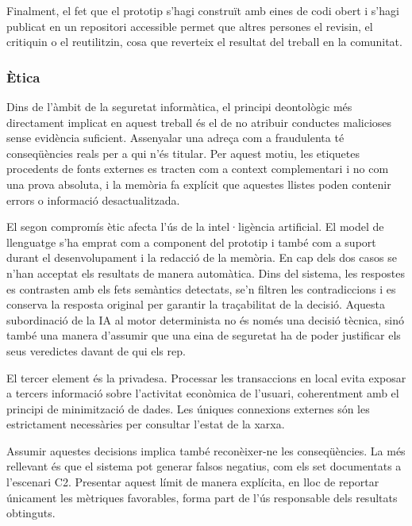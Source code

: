 Finalment, el fet que el prototip s'hagi construït amb eines de codi obert i s'hagi publicat en un repositori accessible permet que altres persones el revisin, el critiquin o el reutilitzin, cosa que reverteix el resultat del treball en la comunitat.

\subsubsection{Ètica}

Dins de l'àmbit de la seguretat informàtica, el principi deontològic més directament implicat en aquest treball és el de no atribuir conductes malicioses sense evidència suficient. Assenyalar una adreça com a fraudulenta té conseqüències reals per a qui n'és titular. Per aquest motiu, les etiquetes procedents de fonts externes \cite{mew_ethereum_lists} es tracten com a context complementari i no com una prova absoluta, i la memòria fa explícit que aquestes llistes poden contenir errors o informació desactualitzada.

El segon compromís ètic afecta l'ús de la intel·ligència artificial. El model de llenguatge s'ha emprat com a component del prototip i també com a suport durant el desenvolupament i la redacció de la memòria. En cap dels dos casos se n'han acceptat els resultats de manera automàtica. Dins del sistema, les respostes es contrasten amb els fets semàntics detectats, se'n filtren les contradiccions i es conserva la resposta original per garantir la traçabilitat de la decisió. Aquesta subordinació de la IA al motor determinista no és només una decisió tècnica, sinó també una manera d'assumir que una eina de seguretat ha de poder justificar els seus veredictes davant de qui els rep.

El tercer element és la privadesa. Processar les transaccions en local evita exposar a tercers informació sobre l'activitat econòmica de l'usuari, coherentment amb el principi de minimització de dades. Les úniques connexions externes són les estrictament necessàries per consultar l'estat de la xarxa.

Assumir aquestes decisions implica també reconèixer-ne les conseqüències. La més rellevant és que el sistema pot generar falsos negatius, com els set documentats a l'escenari C2. Presentar aquest límit de manera explícita, en lloc de reportar únicament les mètriques favorables, forma part de l'ús responsable dels resultats obtinguts.
